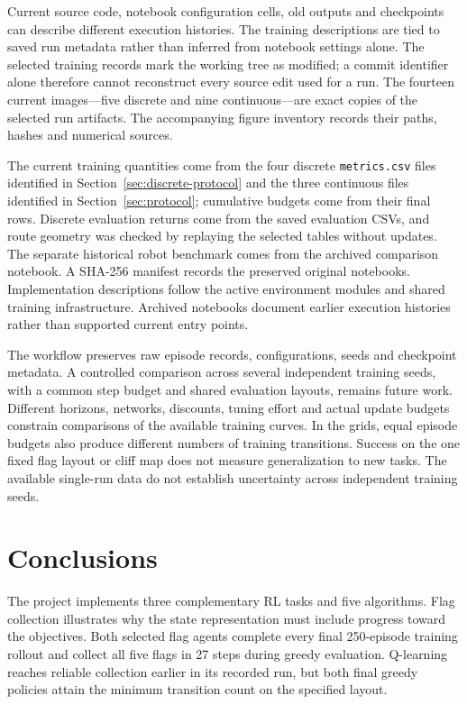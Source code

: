 \documentclass[11pt,a4paper]{article}
\theoremstyle{definition}
\theoremstyle{plain}
\theoremstyle{remark}
\newcommand{\code}[1]{\texttt{#1}}
\begin{document}
Current source code, notebook configuration cells, old outputs and checkpoints can describe different execution histories. The training descriptions are tied to saved run metadata rather than inferred from notebook settings alone. The selected training records mark the working tree as modified; a commit identifier alone therefore cannot reconstruct every source edit used for a run. The fourteen current images---five discrete and nine continuous---are exact copies of the selected run artifacts. The accompanying figure inventory records their paths, hashes and numerical sources.

The current training quantities come from the four discrete \code{metrics.csv} files identified in Section~\ref{sec:discrete-protocol} and the three continuous files identified in Section~\ref{sec:protocol}; cumulative budgets come from their final rows. Discrete evaluation returns come from the saved evaluation CSVs, and route geometry was checked by replaying the selected tables without updates. The separate historical robot benchmark comes from the archived comparison notebook. A SHA-256 manifest records the preserved original notebooks. Implementation descriptions follow the active environment modules and shared  training infrastructure. Archived notebooks document earlier execution histories rather than supported current entry points.

The workflow preserves raw episode records, configurations, seeds and checkpoint metadata. A controlled comparison across several independent training seeds, with a common step budget and shared evaluation layouts, remains future work. Different horizons, networks, discounts, tuning effort and actual update budgets constrain comparisons of the available training curves. In the grids, equal episode budgets also produce different numbers of training transitions. Success on the one fixed flag layout or cliff map does not measure generalization to new tasks. The available single-run data do not establish uncertainty across independent training seeds.

\section{Conclusions}
\label{sec:conclusions}

The project implements three complementary RL tasks and five algorithms. Flag collection illustrates why the state representation must include progress toward the objectives. Both selected flag agents complete every final 250-episode training rollout and collect all five flags in 27 steps during greedy evaluation. Q-learning reaches reliable collection earlier in its recorded run, but both final greedy policies attain the minimum transition count on the specified layout.
\end{document}
